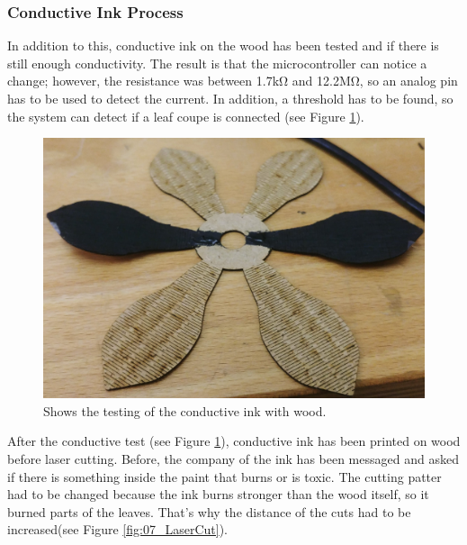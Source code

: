 \documentclass[04.3_buildingProcess.tex]{subfiles}
\begin{document}
    \subsubsection{Conductive Ink Process}
    \begin{flushleft}
        \noindent
        In addition to this, conductive ink \cite{conductiveInk} on the wood has been tested and if there is 
        still enough conductivity. The result is that the microcontroller can notice a 
        change; however, the resistance was between 1.7k\si{\ohm} and 12.2M\si{\ohm}, 
        so an analog pin has to be used to detect the current. In addition, a threshold has to be found, so 
        the system can detect if a leaf coupe is connected (see Figure \ref{fig:leaveConductiveInk}).

        \begin{figure}[h!]
            \centering
            \includegraphics[scale=0.05]{images/materialProcess/leaveTesting_.jpg}
            \caption{Shows the testing of the conductive ink with wood.}
            \label{fig:leaveConductiveInk}
        \end{figure}

        \noindent
        After the conductive test (see Figure \ref{fig:leaveConductiveInk}), conductive ink has been 
        printed on wood before laser cutting. Before, the company of the ink has been messaged and asked 
        if there is something inside the paint that burns or is toxic. The cutting patter had to be changed 
        because the ink burns stronger than the wood itself, so it burned parts of the leaves. 
        That's why the distance of the cuts had to be increased(see Figure \ref{fig:07_LaserCut}). 


\end{flushleft}
\end{document}
